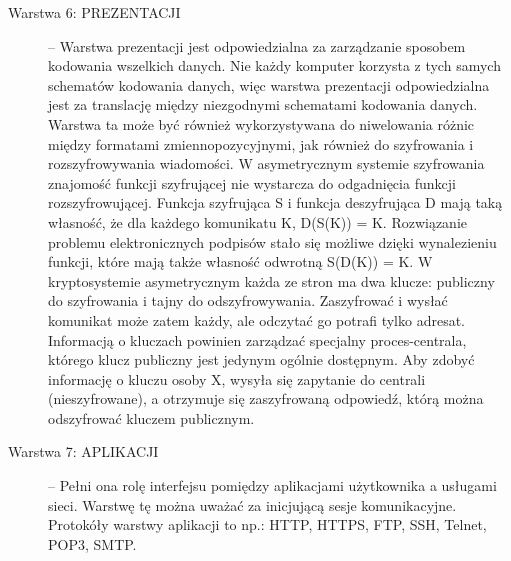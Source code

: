 \documentclass[a4paper,11pt]{article}
\begin{document}
\begin{description}
\item [Warstwa 6: PREZENTACJI] -- Warstwa prezentacji jest odpowiedzialna za zarządzanie sposobem kodowania wszelkich danych. Nie każdy komputer korzysta z tych samych schematów kodowania danych, więc warstwa prezentacji odpowiedzialna jest za translację między niezgodnymi schematami kodowania danych. Warstwa ta może być również wykorzystywana do niwelowania różnic między formatami zmiennopozycyjnymi, jak również do szyfrowania i rozszyfrowywania wiadomości.  W asymetrycznym systemie szyfrowania znajomość funkcji szyfrującej nie wystarcza do odgadnięcia funkcji rozszyfrowującej. Funkcja szyfrująca S i funkcja deszyfrująca D mają taką własność, że dla każdego komunikatu K, D(S(K)) = K. Rozwiązanie problemu elektronicznych podpisów stało się możliwe dzięki wynalezieniu funkcji, które mają także własność odwrotną S(D(K)) = K. W kryptosystemie asymetrycznym każda ze stron ma dwa klucze: publiczny do szyfrowania i tajny do odszyfrowywania. Zaszyfrować i wysłać komunikat może zatem każdy, ale odczytać go potrafi tylko adresat. Informacją o kluczach powinien zarządzać specjalny proces-centrala, którego klucz publiczny jest jedynym ogólnie dostępnym. Aby zdobyć informację o kluczu osoby X, wysyła się zapytanie do centrali (nieszyfrowane), a otrzymuje się zaszyfrowaną odpowiedź, którą można odszyfrować kluczem publicznym. 
\item [Warstwa 7: APLIKACJI] -- Pełni ona rolę interfejsu pomiędzy aplikacjami użytkownika a usługami sieci. Warstwę tę można uważać za inicjującą sesje komunikacyjne. Protokóły warstwy aplikacji to np.: HTTP, HTTPS, FTP, SSH, Telnet, POP3, SMTP.   
\end{description}
\end{document}
